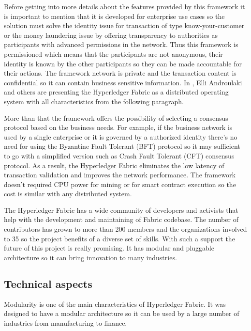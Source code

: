 Before getting into more details about the features provided by this framework it is important to mention that it is developed for enterprise use cases so the solution must solve the identity issue for transaction of type know-your-customer or the money laundering issue by offering transparency to authorities as participants with advanced permissions in the network. Thus this framework is permissioned which means that the participants are not anonymous, their identity is known by the other participants so they can be made accountable for their actions. The framework network is private and the transaction content is confidential so it can contain business sensitive information. In \cite{fabric-doc}, Elli Androulaki and others are presenting the Hyperledger Fabric as a distributed operating system with all characteristics from the following paragraph.

More than that the framework offers the  possibility of selecting a consensus protocol based on the business needs. For example, if the business network is used by a single enterprise or it is governed by a authorized identity there's no need for using the Byzantine Fault Tolerant (BFT) protocol so it may sufficient to go with a simplified version such as Crash Fault Tolerant (CFT) consensus protocol. As a result, the Hyperledger Fabric eliminates the low latency of transaction validation and  improves the network performance. The framework doesn't required CPU power for mining or for smart contract execution so the cost is similar with any distributed system.

The Hyperledger Fabric has a wide community of developers and activists that help with the development and maintaining of Fabric codebase. The number of contributors has grown to more than 200 members and the organizations involved to 35 so the project benefits of a diverse set of skills. With such a support the future of this project is really promising. It has modular and pluggable architecture so it can bring innovation to many industries.

\subsection{Technical aspects}
\label{sub-sec:chapter1-subsection2}

Modularity is one of the main characteristics of Hyperledger Fabric. It was
designed to have a modular architecture so it can be used by a large number of industries from manufacturing to finance. 

